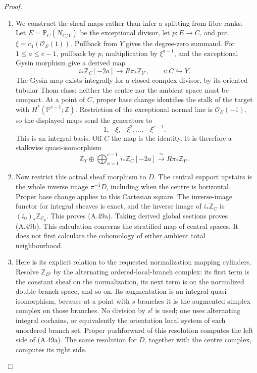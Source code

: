 \begin{proof}
\begin{enumerate}[label=\arabic*.,leftmargin=*]
\item We construct the sheaf maps rather than infer a
splitting from fibre ranks. Let $E=\mathbb P_C(N_{C/Y})$
be the exceptional divisor, let $p:E\to C$, and put
$\xi=c_1(\mathcal O_E(1))$. Pullback from $Y$ gives
the degree-zero summand. For $1\leq a\leq c-1$,
pullback by $p$, multiplication by $\xi^{a-1}$,
and the exceptional Gysin morphism give a derived
map
\[
 i_*\mathbb Z_C[-2a]\longrightarrow
 R\pi_*\mathbb Z_{Y'},\qquad i:C\hookrightarrow Y.
\]
The Gysin map exists integrally for a closed complex
divisor, by its oriented tubular Thom class; neither
the centre nor the ambient space must be compact.
At a point of $C$, proper base change identifies
the stalk of the target with
$H^*(\mathbb P^{c-1};\mathbb Z)$.
Restriction of the exceptional normal line is
$\mathcal O_E(-1)$, so the displayed maps send
the generators to
\[
 1,-\xi,-\xi^2,\ldots,-\xi^{c-1}.
\]
This is an integral basis. Off $C$ the map is
the identity. It is therefore a stalkwise
quasi-isomorphism
\[
 \mathbb Z_Y\oplus
 \bigoplus_{a=1}^{c-1}i_*\mathbb Z_C[-2a]
 \xrightarrow{\ \simeq\ }R\pi_*\mathbb Z_{Y'}.
\]

\item Now restrict this actual sheaf morphism to $D$.
The central support upstairs is the whole inverse
image $\pi^{-1}D$, including when the centre is
horizontal. Proper base change applies to this
Cartesian square. The inverse-image functor for
integral sheaves is exact, and the inverse image
of $i_*\mathbb Z_C$ is
$(i_0)_*\mathbb Z_{C_0}$. This proves (A.49a).
Taking derived global sections proves (A.49b).
This calculation concerns the stratified map of
central spaces. It does not first calculate the
cohomology of either ambient total neighbourhood.

\item Here is its explicit relation to the requested
normalization mapping cylinders. Resolve
$\mathbb Z_{D'}$ by the alternating ordered-local-branch
complex: its first term is the constant sheaf on
the normalization, its next term is on the normalized
double-branch space, and so on. Its augmentation is
an integral quasi-isomorphism, because at a point
with $s$ branches it is the augmented simplex
complex on those branches. No division by $s!$ is
used; one uses alternating integral cochains, or
equivalently the orientation local system of each
unordered branch set. Proper pushforward of this
resolution computes the left side of (A.49a).
The same resolution for $D$, together with the
centre complex, computes its right side.


\end{enumerate}
\end{proof}

